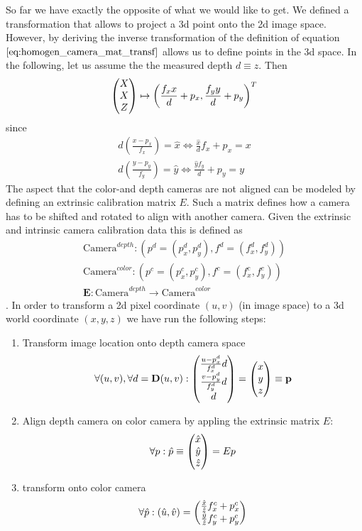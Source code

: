 So far we have exactly the opposite of what we would like to get. We defined a transformation that allows to project a 3d point onto the 2d image space. However, by deriving the inverse transformation of the definition of equation $\ref{eq:homogen_camera_mat_transf}$ allows us to define points in the 3d space. In the following, let us assume the the measured depth $d \equiv z$. Then
\begin{equation}
	\colvec[X]{X}{Z} \mapsto \left( \frac{f_x x}{d} + p_x, \frac{f_y y}{d} + p_y \right)^T
\end{equation}
since
\begin{equation}
\begin{aligned}
	d \left( \frac{x - p_x}{f_x} \right) = \hat{x} \Leftrightarrow \frac{\hat{x}}{d} f_x + p_x = x \\
	d \left( \frac{y - p_y}{f_y} \right) = \hat{y} \Leftrightarrow \frac{\hat{y} f_y}{d} + p_y = y 
\end{aligned}
\label{eq:depth_tranfomation}
\end{equation}
The aspect that the color-and depth cameras are not aligned can be modeled by defining an extrinsic calibration matrix $E$. Such a matrix defines how a camera has to be shifted and rotated to align with another camera. Given the extrinsic and intrinsic camera calibration data this is defined as
\begin{equation}
\begin{aligned}
	\text{Camera}^{depth} : \left( p^d = (p_x^d, p_y^d), f^d = (f_x^d, f_y^d)\right) \\
	\text{Camera}^{color} : \left( p^c = (p_x^c, p_y^c), f^c = (f_x^c, f_y^c)\right) \\
	\textbf{E} : \text{Camera}^{depth} \rightarrow \text{Camera}^{color}
\end{aligned}
\label{eq:calib_data}
\end{equation}.
In order to transform a 2d pixel coordinate $\left( u, v \right)$ (in image space) to a 3d world coordinate $\left( x, y, z \right)$ we have run the following steps:
\begin{enumerate}
\item Transform image location onto depth camera space
\begin{equation}
	\forall (u, v), \forall d = \textbf{D}(u,v): \colvec[\frac{u - p_x^d}{f_x^d} d]{\frac{v - p_y^d}{f_y^d} d}{d} = \colvec[x]{y}{z} \equiv \bf{p}
\end{equation}
\item Align depth camera on color camera by appling the extrinsic matrix $E$:
\begin{equation}
	\forall p: \hat{p} \equiv \colvec[\hat{x}]{\hat{y}}{\hat{z}} =  E p
\end{equation}
\item transform onto color camera
\begin{equation}
	\forall \hat{p} : \left( \hat{u}, \hat{v}\right) = \colvec{\frac{\hat{x}}{\hat{z}} f_x^c + p_x^c}{\frac{\hat{y}}{\hat{z}} f_y^c + p_y^c}
\end{equation}
\end{enumerate}

